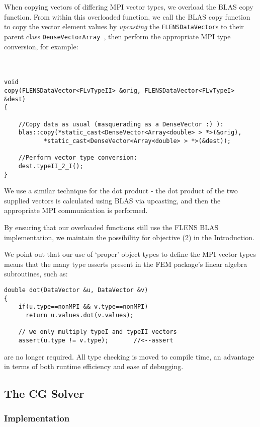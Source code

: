 When copying vectors of differing MPI vector types, we overload the BLAS copy function. From within this overloaded function, we call the BLAS copy function to copy the vector element values by \emph{upcasting} the \texttt{FLENSDataVector}s to their parent class \texttt{DenseVector\<Array\<\double\> \>}, then perform the appropriate MPI type conversion, for example:
\\\\\\
\begin{lstlisting}
void
copy(FLENSDataVector<FLvTypeII> &orig, FLENSDataVector<FLvTypeI> &dest) 
{

	//Copy data as usual (masquerading as a DenseVector :) ):
	blas::copy(*static_cast<DenseVector<Array<double> > *>(&orig),
		   *static_cast<DenseVector<Array<double> > *>(&dest));

	//Perform vector type conversion:
	dest.typeII_2_I();
}
\end{lstlisting}

We use a similar technique for the dot product - the dot product of the two supplied vectors is calculated using BLAS via upcasting, and then the appropriate MPI communication is performed.

By ensuring that our overloaded functions still use the FLENS BLAS implementation, we maintain the possibility for objective (2) in the Introduction.

We point out that our use of `proper' object types to define the MPI vector types means that the many type asserts present in the FEM package's linear algebra subroutines, such as:
\begin{lstlisting}
double dot(DataVector &u, DataVector &v)
{
	if(u.type==nonMPI && v.type==nonMPI) 
	  return u.values.dot(v.values);
	
	// we only multiply typeI and typeII vectors
	assert(u.type != v.type);		//<--assert
\end{lstlisting}
are no longer required. All type checking is moved to compile time, an advantage in terms of both runtime efficiency and ease of debugging.

\subsection{The CG Solver}

\subsubsection{Implementation}

